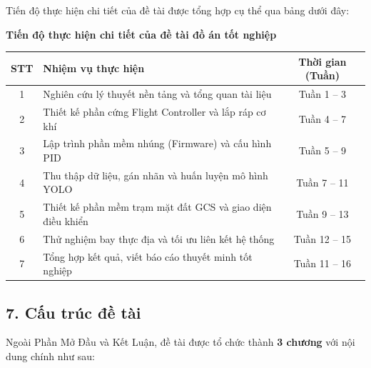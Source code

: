 \begin{center}
    \begin{minipage}{\textwidth}
        Tiến độ thực hiện chi tiết của đề tài được tổng hợp cụ thể qua bảng dưới đây:
        
        \vspace{6pt}
        \centering
        \textbf{\fontsize{12pt}{14pt}\selectfont Tiến độ thực hiện chi tiết của đề tài đồ án tốt nghiệp}
        \vspace{8pt}
        
        \renewcommand{\arraystretch}{1.3}
        \fontsize{11pt}{13pt}\selectfont
        \begin{tabular}{|c|p{8.5cm}|c|}
            \hline
            \textbf{STT} & \textbf{Nhiệm vụ thực hiện} & \textbf{Thời gian (Tuần)} \\ \hline
            1 & Nghiên cứu lý thuyết nền tảng và tổng quan tài liệu & Tuần 1 -- 3 \\ \hline
            2 & Thiết kế phần cứng Flight Controller và lắp ráp cơ khí & Tuần 4 -- 7 \\ \hline
            3 & Lập trình phần mềm nhúng (Firmware) và cấu hình PID & Tuần 5 -- 9 \\ \hline
            4 & Thu thập dữ liệu, gán nhãn và huấn luyện mô hình YOLO & Tuần 7 -- 11 \\ \hline
            5 & Thiết kế phần mềm trạm mặt đất GCS và giao diện điều khiển & Tuần 9 -- 13 \\ \hline
            6 & Thử nghiệm bay thực địa và tối ưu liên kết hệ thống & Tuần 12 -- 15 \\ \hline
            7 & Tổng hợp kết quả, viết báo cáo thuyết minh tốt nghiệp & Tuần 11 -- 16 \\ \hline
        \end{tabular}
    \end{minipage}
\end{center}

\subsection*{7. Cấu trúc đề tài}

Ngoài Phần Mở Đầu và Kết Luận, đề tài được tổ chức thành \textbf{3 chương} với nội dung chính như sau:

